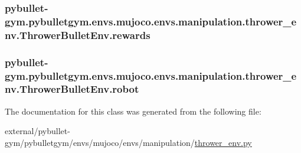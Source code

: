 \subsubsection[{\texorpdfstring{rewards}{rewards}}]{\setlength{\rightskip}{0pt plus 5cm}pybullet-\/gym.\+pybulletgym.\+envs.\+mujoco.\+envs.\+manipulation.\+thrower\+\_\+env.\+Thrower\+Bullet\+Env.\+rewards}\hypertarget{classpybullet-gym_1_1pybulletgym_1_1envs_1_1mujoco_1_1envs_1_1manipulation_1_1thrower__env_1_1_thrower_bullet_env_a0693609e366bc703a8c5c58c69a28318}{}\label{classpybullet-gym_1_1pybulletgym_1_1envs_1_1mujoco_1_1envs_1_1manipulation_1_1thrower__env_1_1_thrower_bullet_env_a0693609e366bc703a8c5c58c69a28318}
\subsubsection[{\texorpdfstring{robot}{robot}}]{\setlength{\rightskip}{0pt plus 5cm}pybullet-\/gym.\+pybulletgym.\+envs.\+mujoco.\+envs.\+manipulation.\+thrower\+\_\+env.\+Thrower\+Bullet\+Env.\+robot}\hypertarget{classpybullet-gym_1_1pybulletgym_1_1envs_1_1mujoco_1_1envs_1_1manipulation_1_1thrower__env_1_1_thrower_bullet_env_a859d2fe8c0814b6989db639504c2f899}{}\label{classpybullet-gym_1_1pybulletgym_1_1envs_1_1mujoco_1_1envs_1_1manipulation_1_1thrower__env_1_1_thrower_bullet_env_a859d2fe8c0814b6989db639504c2f899}


The documentation for this class was generated from the following file\+:\begin{DoxyCompactItemize}
\item 
external/pybullet-\/gym/pybulletgym/envs/mujoco/envs/manipulation/\hyperlink{mujoco_2envs_2manipulation_2thrower__env_8py}{thrower\+\_\+env.\+py}\end{DoxyCompactItemize}
